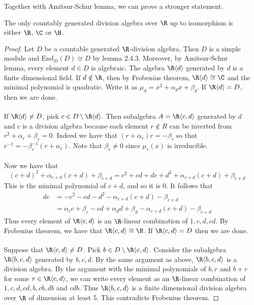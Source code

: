 \documentclass[a4paper]{article}
\begin{document}
Together with Amitsur-Schur lemma, we can prove a stronger statement. 

\begin{thm}{}{} The only countably generated division algebra over $\R$ up to isomorphism is either $\R$, $\C$ or $\H$. \tcbline
\begin{proof}
Let $D$ be a countable generated $\R$-division algebra. Then $D$ is a simple module and $\text{End}_D(D)\cong D$ by lemma 2.4.3. Moreover, by Amitsur-Schur lemma, every element $d\in D$ is algebraic. The algebra $\R\langle d\rangle$ generated by $d$ is a finite dimensional field. If $d\notin\R$, then by Frobenius theorem, $\R\langle d\rangle\cong\C$ and the minimal polynomial is quadratic. Write it as $\mu_d=x^2+\alpha_dx+\beta_d$. If $\R\langle d\rangle=D$, then we are done. \\~\\

If $\R\langle d\rangle\neq D$, pick $c\in D\setminus\R\langle d\rangle$. Then subalgebra $A=\R\langle c,d\rangle$ generated by $d$ and $c$ is a division algebra because each element $r\notin R$ can be inverted from $r^2+\alpha_r+\beta_r=0$. Indeed we have that $(r+\alpha_r)r=-\beta_r$ so that $r^{-1}=-\beta_r^{-1}(r+\alpha_r)$. Note that $\beta_r\neq0$ since $\mu_r(x)$ is irreducible. \\~\\

Now we have that $$(c+d)^2+\alpha_{c+d}(c+d)+\beta_{c+d}=c^2+cd+dc+d^2+\alpha_{c+d}(c+d)+\beta_{c+d}$$ This is the minimal polynomial of $c+d$, and so it is $0$. It follows that 
\begin{align*}
dc&=-c^2-cd-d^2-\alpha_{c+d}(c+d)-\beta_{c+d}\\
&=\alpha_cc+\beta_c-cd+\alpha_dd+\beta_d-\alpha_{c+d}(c+d)-\beta_{c+d}
\end{align*}
Thus every element of $\R\langle c,d\rangle$ is an $\R$-linear combination of $1,c,d,cd$. By Frobenius theorem, we have that $\R\langle c,d\rangle\cong\H$. If $\R\langle c,d\rangle=D$ then we are done. \\~\\

Suppose that $\R\langle c,d\rangle\neq D$. Pick $b\in D\setminus\R\langle c,d\rangle$. Consider the subalgebra $\R\langle b,c,d\rangle$ generated by $b,c,d$. By the same argument as above, $\R\langle b,c,d\rangle$ is a division algebra. By the argument with the minimal polynomials of $b,r$ and $b+r$ for some $r\in\R\langle c,d\rangle$, we can write every element as an $\R$-linear combination of $1,c,d,cd,b,cb,db$ and $cdb$. Thus $\R\langle b,c,d\rangle$ is a finite dimensional division algebra over $\R$ of dimension at least $5$. This contradicts Frobenius theorem. 
\end{proof}
\end{thm}
\end{document}
